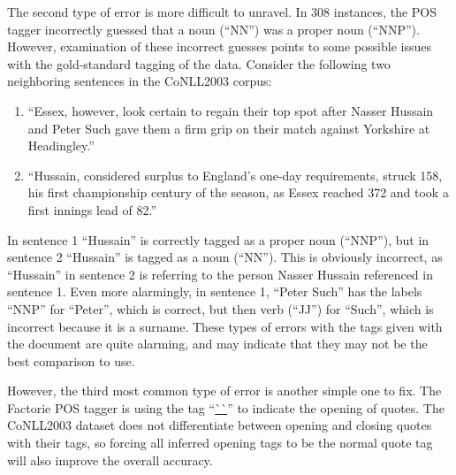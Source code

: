 \documentclass[12pt]{article}
\begin{document}
The second type of error is more difficult to unravel. In 308 instances, the POS tagger incorrectly guessed that a noun (``NN'') was a proper noun (``NNP''). However, examination of these incorrect guesses points to some possible issues with the gold-standard tagging of the data. Consider the following two neighboring sentences in the CoNLL2003 corpus:

\begin{enumerate}
\item ``Essex, however, look certain to regain their top spot after Nasser Hussain and Peter Such gave them a firm grip on their match against Yorkshire at Headingley.''
\item ``Hussain, considered surplus to England’s one-day requirements, struck 158, his first championship century of the season, as Essex reached 372 and took a first innings lead of 82.''
\end{enumerate}

In sentence 1 ``Hussain'' is correctly tagged as a proper noun (``NNP''), but in sentence 2 ``Hussain'' is tagged as a noun (``NN''). This is obviously incorrect, as ``Hussain'' in sentence 2 is referring to the person Nasser Hussain referenced in sentence 1. Even more alarmingly, in sentence 1, ``Peter Such'' has the labels ``NNP'' for ``Peter'', which is correct, but then verb (``JJ'') for ``Such'', which is incorrect because it is a surname. These types of errors with the tags given with the document are quite alarming, and may indicate that they may not be the best comparison to use.

However, the third most common type of error is another simple one to fix. The Factorie POS tagger is using the tag ``\url{``}'' to indicate the opening of quotes. The CoNLL2003 dataset does not differentiate between opening and closing quotes with their tags, so forcing all inferred opening tags to be the normal quote tag will also improve the overall accuracy.
\end{document}
